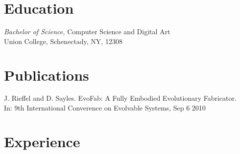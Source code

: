 \documentclass{res} %
\begin{document}
\begin{resume}

\section{Education}

{\sl Bachelor of Science,} Computer Science and Digital Art \\
Union College, Schenectady, NY, 12308


\section{Publications}
J. Rieffel and D. Sayles. EvoFab: A Fully Embodied Evolutionary Fabricator.  \\In: 9th International Converence on Evolvable Systems, Sep 6 2010 \\

 
\section{Experience}


\end{resume}
\end{document}
